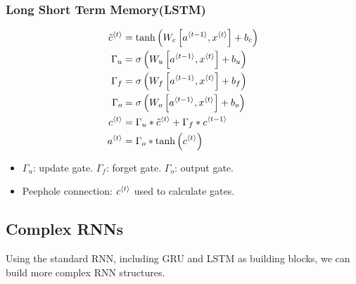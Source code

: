 \subsubsection{Long Short Term Memory(LSTM)}
\begin{align*}
  \tilde{c}^{\left\langle t\right\rangle}&=\tanh\left(W_c\left[a^{\left\langle t-1\right\rangle},x^{\left\langle t\right\rangle}\right]+b_c\right)\\
  \Gamma_u&=\sigma\left(W_u\left[a^{\left\langle t-1\right\rangle},x^{\left\langle t\right\rangle}\right]+b_u\right)\\
  \Gamma_f&=\sigma\left(W_f\left[a^{\left\langle t-1\right\rangle},x^{\left\langle t\right\rangle}\right]+b_f\right)\\
  \Gamma_o&=\sigma\left(W_o\left[a^{\left\langle t-1\right\rangle},x^{\left\langle t\right\rangle}\right]+b_o\right)\\
  c^{\left\langle t\right\rangle}&=\Gamma_u\ast \tilde{c}^{\left\langle t\right\rangle}+\Gamma_f \ast c^{\left\langle t-1\right\rangle}\\
  a^{\left\langle t\right\rangle}&=\Gamma_o\ast \tanh\left(c^{\left\langle t\right\rangle}\right)
\end{align*}
\begin{itemize}
  \item $\Gamma_u$: update gate. $\Gamma_f$: forget gate. $\Gamma_o$: output gate.
  \item Peephole connection: $c^{\left\langle t\right\rangle}$ used to calculate gates.
\end{itemize}
\subsection{Complex RNNs}
Using the standard RNN, including GRU and LSTM as building blocks, we can build more complex RNN structures.

